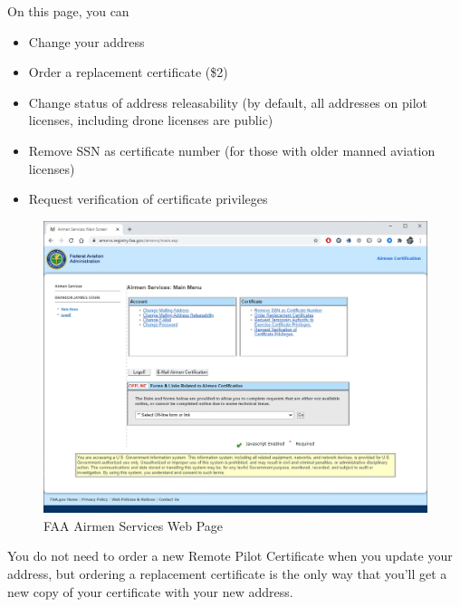 \documentclass[
  12pt,
]{book}
\providecommand{\tightlist}{%
  \setlength{\itemsep}{0pt}\setlength{\parskip}{0pt}}
\begin{document}
On this page, you can

\begin{itemize}
\tightlist
\item
  Change your address
\item
  Order a replacement certificate (\$2)
\item
  Change status of address releasability (by default, all addresses on pilot licenses, including drone licenses are public)
\item
  Remove SSN as certificate number (for those with older manned aviation licenses)
\item
  Request verification of certificate privileges
\end{itemize}

\begin{figure}

{\centering \includegraphics[width=0.7\linewidth]{images/airmen-services} 

}

\caption{FAA Airmen Services Web Page}\label{fig:airmen-services}
\end{figure}

You do not need to order a new Remote Pilot Certificate when you update your address, but ordering a replacement certificate is the only way that you'll get a new copy of your certificate with your new address.
\end{document}

